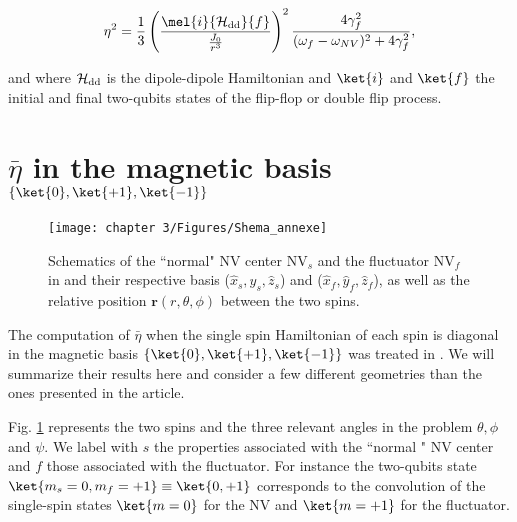 \documentclass[a4paper, 11pt]{report}
\begin{document}
\begin{equation}
\label{eq. eta debut annexe}
\eta^2=\frac{1}{3} \left(\frac{\mel{i}{\mathcal{H_{\rm dd}}}{f}}{\frac{J_0}{r^3}}\right)^2 \frac{4\gamma_f^2}{(\omega_f - \omega_{NV})^2+4\gamma_f^2},
\end{equation}

and where $\mathcal{H_{\rm dd}}$ is the dipole-dipole Hamiltonian and $\ket{i}$ and $\ket{f}$ the initial and final two-qubits states of the flip-flop or double flip process.

\section{$\bar \eta$ in the magnetic basis $\{ \ket{0}, \ket{+1}, \ket{-1}\}$}

\begin{figure}[h]
\centering
\texttt{[image: chapter 3/Figures/Shema\_annexe]}
\caption{Schematics of the ``normal" NV center NV$_s$ and the fluctuator NV$_f$ in and their respective basis ($\hat x_s,\hat y_s,\hat z_s$) and ($\hat x_f,\hat y_f,\hat z_f$), as well as the relative position $\mathbf{r}(r,\theta,\phi)$ between the two spins.}
\label{shema spins annexe}
\end{figure}

The computation of $\bar \eta$ when the single spin Hamiltonian of each spin is diagonal in the magnetic basis $\{ \ket{0}, \ket{+1}, \ket{-1}\}$ was treated in \citep{choi2017depolarization}. We will summarize their results here and consider a few different geometries than the ones presented in the article.

Fig. \ref{shema spins annexe} represents the two spins and the three relevant angles in the problem $\theta,\phi$ and $\psi$. We label with $s$ the properties associated with the ``normal " NV center and $f$ those associated with the fluctuator. For instance the two-qubits state $\ket{m_s=0,m_f=+1}\equiv\ket{0,+1}$ corresponds to the convolution of the single-spin states $\ket{m=0}$ for the NV and $\ket{m=+1}$ for the fluctuator.
\end{document}
